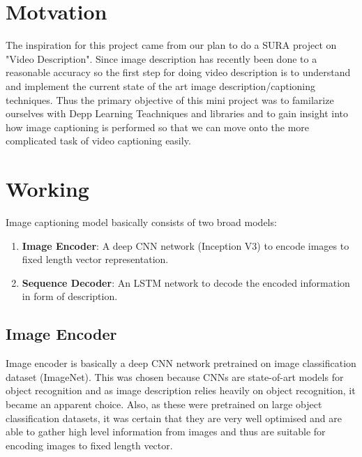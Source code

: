 \documentclass[11pt]{article}
\begin{document}
	\section{Motvation}

The inspiration for this project came from our plan to do a SURA project on "Video Description". Since image description has recently been done to a reasonable accuracy so the first step for doing video description is to understand and implement the current state of the art image description/captioning techniques. Thus the primary objective of this mini project was to familarize ourselves with Depp Learning Teachniques and libraries and to gain insight into how image captioning is performed so that we can move onto the more complicated task of video captioning easily.



	\section{Working}
		Image captioning model basically consists of two broad models:
		\begin{enumerate}
		\item
			\textbf{Image Encoder}: A deep CNN network (Inception V3) to encode images to fixed length vector representation.
		\item
			\textbf{Sequence Decoder}: An LSTM network to decode the encoded information in form of description.
		\end{enumerate}
		\subsection{Image Encoder}
			Image encoder is basically a deep CNN network pretrained on image classification dataset (ImageNet). This was chosen because CNNs are state-of-art models for object recognition and as image description relies heavily on object recognition, it became an apparent choice. Also, as these were pretrained on large object classification datasets, it was certain that they are very well optimised and are able to gather high level information from images and thus are suitable for encoding images to fixed length vector.
\end{document}
